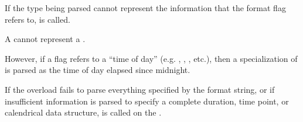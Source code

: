 \pnum
If the type being parsed cannot represent
the information that the format flag refers to,
 is called.
\begin{example}
A  cannot represent a .
\end{example}
However, if a flag refers to a ``time of day''
(e.g. , , , etc.),
then a specialization of  is parsed as
the time of day elapsed since midnight.

\pnum
If the  overload fails to parse
everything specified by the format string,
or if insufficient information is parsed to specify a complete
duration, time point, or calendrical data structure,
is called on the .

